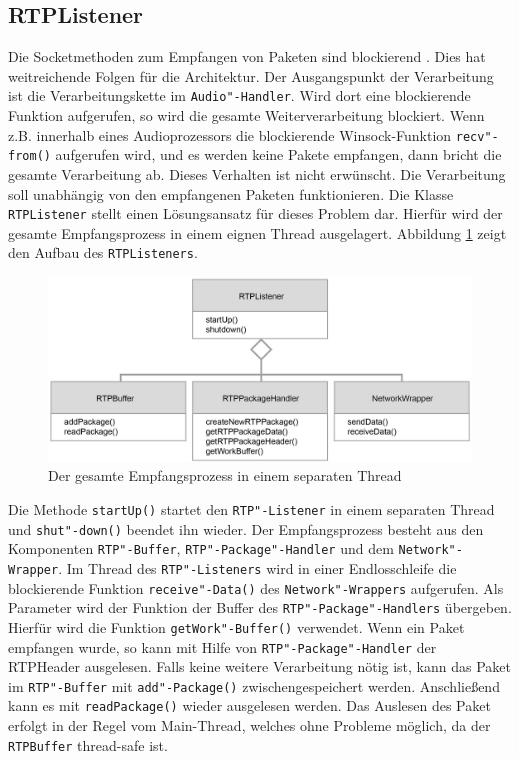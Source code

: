 \FloatBarrier
\subsection{RTPListener}
Die Socketmethoden zum Empfangen von Paketen sind blockierend \cite{WinsockReference}. Dies hat weitreichende Folgen für die Architektur. Der Ausgangspunkt der Verarbeitung ist die Verarbeitungskette im \texttt{Audio"-Handler}. Wird dort eine blockierende Funktion aufgerufen, so wird die gesamte Weiterverarbeitung blockiert. Wenn z.B. innerhalb eines Audioprozessors die blockierende Winsock-Funktion \texttt{recv"-from()} aufgerufen wird, und es werden keine Pakete empfangen, dann bricht die gesamte Verarbeitung ab. Dieses Verhalten ist nicht erwünscht. Die Verarbeitung soll unabhängig von den empfangenen Paketen funktionieren. Die Klasse \texttt{RTPListener} stellt einen Lösungsansatz für dieses Problem dar. Hierfür wird der gesamte Empfangsprozess in einem eignen Thread ausgelagert. Abbildung \ref{Fig:RTPListenerAdvanced} zeigt den Aufbau des \texttt{RTPListeners}.
\newline
\begin{figure}[htp]
\centering
\includegraphics[width=1\textwidth]{../img/RTPListenerAdvanced}
\caption{Der gesamte Empfangsprozess in einem separaten Thread}
\label{Fig:RTPListenerAdvanced}
\end{figure}

Die Methode \texttt{startUp()} startet den \texttt{RTP"-Listener} in einem separaten Thread und \texttt{shut"-down()} beendet ihn wieder. Der Empfangsprozess besteht aus den Komponenten \texttt{RTP"-Buffer}, \texttt{RTP"-Package"-Handler} und dem \texttt{Network"-Wrapper}. Im Thread des \texttt{RTP"-Listeners} wird in einer Endlosschleife die blockierende Funktion \texttt{receive"-Data()} des \texttt{Network"-Wrappers} aufgerufen. Als Parameter wird der Funktion der Buffer des \texttt{RTP"-Package"-Handlers} übergeben. Hierfür wird die Funktion \texttt{getWork"-Buffer()} verwendet. Wenn ein Paket empfangen wurde, so kann mit Hilfe von \texttt{RTP"-Package"-Handler} der RTPHeader ausgelesen. Falls keine weitere Verarbeitung nötig ist, kann das Paket im \texttt{RTP"-Buffer} mit \texttt{add"-Package()} zwischengespeichert werden. Anschließend kann es mit \texttt{readPackage()} wieder ausgelesen werden. Das Auslesen des Paket erfolgt in der Regel vom Main-Thread, welches ohne Probleme möglich, da der \texttt{RTPBuffer} thread-safe ist.

